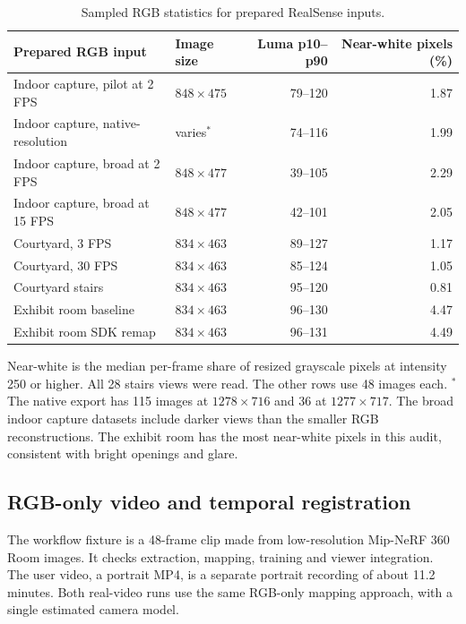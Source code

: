 \documentclass[11pt,a4paper]{article}
\begin{document}
\begin{table}[!ht]
\centering\small
\begin{tabularx}{\linewidth}{@{}Ylrr@{}}
\toprule
\textbf{Prepared RGB input} & \textbf{Image size} & \textbf{Luma p10--p90} & \textbf{Near-white pixels (\%)} \\
\midrule
Indoor capture, pilot at 2 FPS & $848\times475$ & 79--120 & 1.87 \\
Indoor capture, native-resolution & varies$^{\ast}$ & 74--116 & 1.99 \\
Indoor capture, broad at 2 FPS & $848\times477$ & 39--105 & 2.29 \\
Indoor capture, broad at 15 FPS & $848\times477$ & 42--101 & 2.05 \\
Courtyard, 3 FPS & $834\times463$ & 89--127 & 1.17 \\
Courtyard, 30 FPS & $834\times463$ & 85--124 & 1.05 \\
Courtyard stairs & $834\times463$ & 95--120 & 0.81 \\
Exhibit room baseline & $834\times463$ & 96--130 & 4.47 \\
Exhibit room SDK remap & $834\times463$ & 96--131 & 4.49 \\
\bottomrule
\end{tabularx}
\caption{Sampled RGB statistics for prepared RealSense inputs.}
\label{tab:rgbd-rgb}
\end{table}

Near-white is the median per-frame share of resized grayscale pixels at
intensity 250 or higher. All 28 stairs views were read. The other rows use
48 images each. $^{\ast}$The native export has 115 images at $1278\times716$
and 36 at $1277\times717$. The broad indoor capture datasets include darker views
than the smaller RGB reconstructions. The exhibit room has the most
near-white pixels in this audit, consistent with bright openings and glare.

\clearpage
\subsection{RGB-only video and temporal registration}
The workflow fixture is a 48-frame clip made from low-resolution Mip-NeRF
360 Room images. It checks extraction, mapping, training and viewer
integration. The user video, a portrait MP4, is a separate
portrait recording of about 11.2 minutes. Both real-video runs use the
same RGB-only mapping approach, with a single estimated camera model.
\end{document}
